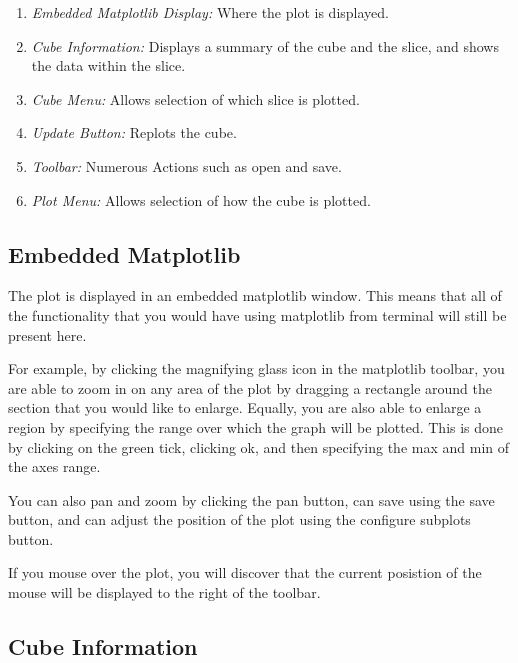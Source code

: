 \documentclass[a4paper,12pt]{article}
\begin{document}
\begin{enumerate}

\item
\emph{Embedded Matplotlib Display:} Where the plot is displayed.

\item
\emph{Cube Information:} Displays a summary of the cube and the slice, and
shows the data within the slice.

\item
\emph{Cube Menu:} Allows selection of which slice is plotted.

\item
\emph{Update Button:} Replots the cube.

\item
\emph{Toolbar:} Numerous Actions such as open and save.

\item
\emph{Plot Menu:} Allows selection of how the cube is plotted.


\end{enumerate}

\subsection{Embedded Matplotlib}

The plot is displayed in an embedded matplotlib window. This means that all of
the functionality that you would have using matplotlib from terminal will still
be present here.

For example, by clicking the magnifying glass icon in the matplotlib toolbar,
you are able to zoom in on any area of the plot by dragging a rectangle around
the section that you would like to enlarge. Equally, you are also able to
enlarge a region by specifying the range over which the  graph will be plotted.
This is done by clicking on the green tick, clicking ok, and then specifying
the max and min of the axes range.

You can also pan and zoom by clicking the pan button, can save using the save
button, and can adjust the position of the plot using the configure subplots
button.

If you mouse over the plot, you will discover that the current posistion of the
mouse will be displayed to the right of the toolbar.

\subsection{Cube Information}
\end{document}
